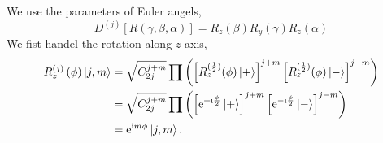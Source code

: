 We use the parameters of Euler angels, 
\begin{equation}
  D^{(j)} \left[ R\left( \gamma, \beta, \alpha \right) \right] = R_{z} \left( \beta \right) R_{y} \left( \gamma \right) R_{z} \left( \alpha \right)
\end{equation}
We fist handel the rotation along $z$-axis, 
\begin{equation}
\begin{aligned}
  R^{(j)}_{z} \left( \phi  \right) \ket{j,m} & = \sqrt{C_{2j}^{j+m}} \prod \left( \left[ R_{z}^{(\frac{1}{2})} (\phi) \ket{+}\right]^{j+m} \left[ R_{z}^{(\frac{1}{2})} (\phi) \ket{-}\right]^{j-m} \right)
  \\
  & = \sqrt{C_{2j}^{j+m}} \prod \left( \left[ \mathrm{e}^{+ \mathrm{i} \frac{\phi }{2}} \ket{+} \right]^{j+m} \left[ \mathrm{e}^{- \mathrm{i} \frac{\phi }{2}} \ket{-} \right]^{j-m}\right)
  \\
  & = \mathrm{e}^{\mathrm{i} m \phi } \ket{j, m}.
\end{aligned}
\end{equation}
